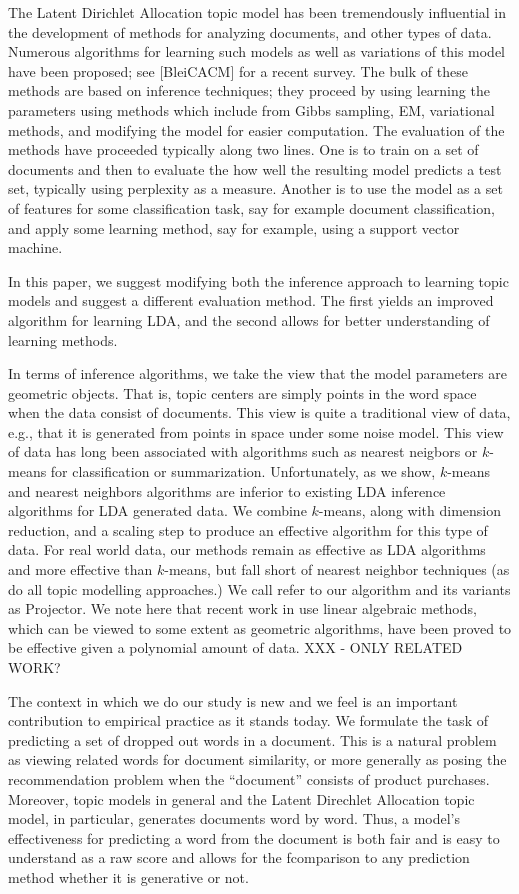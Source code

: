 
The Latent Dirichlet Allocation topic model has been tremendously
influential in the development of methods for analyzing documents, and
other types of data.  Numerous algorithms for learning such models as
well as variations of this model have been proposed; see [BleiCACM]
for a recent survey.  The bulk of these methods are based on inference
techniques; they proceed by using learning the parameters using
methods which include from Gibbs sampling, EM, variational methods,
and modifying the model for easier computation.  The evaluation of the
methods have proceeded typically along two lines.  One is to train on
a set of documents and then to evaluate the how well the resulting
model predicts a test set, typically using perplexity as a measure.
Another is to use the model as a set of features for some
classification task, say for example document classification, and apply some
learning method, say for example, using a support vector machine.

In this paper, we suggest modifying both the inference approach to
learning topic models and suggest a different evaluation method.  The
first yields an improved algorithm for learning LDA, and the second
allows for better understanding of learning methods. 

In terms of inference algorithms, we take the view that the model
parameters are geometric objects.  That is, topic centers are simply
points in the word space when the data consist of documents.  This
view is quite a traditional view of data, e.g., that it is generated
from points in space under some noise model.  This view of data has
long been associated with algorithms such as nearest neigbors or
$k$-means for classification or summarization.  Unfortunately, as we
show, $k$-means and nearest neighbors algorithms are inferior to
existing LDA inference algorithms for LDA generated data.  We combine
$k$-means, along with dimension reduction, and a scaling step to
produce an effective algorithm for this type of data.  For real world
data, our methods remain as effective as LDA algorithms and more
effective than $k$-means, but fall short of nearest neighbor
techniques (as do all topic modelling approaches.) We call refer to
our algorithm and its variants as Projector.   We note here that recent
work in \cite{} use linear algebraic methods, which can be viewed to
some extent as geometric algorithms, have been proved to be effective
given a polynomial amount of data. XXX - ONLY RELATED WORK?

The context in which we do our study is new and we feel is an
important contribution to empirical practice as it stands today.  We
formulate the task of predicting a set of dropped out words in a
document.  This is a natural problem as viewing related words for
document similarity, or more generally as posing the recommendation
problem when the ``document'' consists of product purchases.
Moreover, topic models in general and the Latent Direchlet Allocation
topic model, in particular, generates documents word by word.  Thus, a
model's effectiveness for predicting a word from the document is both
fair and is easy to understand as a raw score and allows for the
fcomparison to any prediction method whether it is generative or not.


